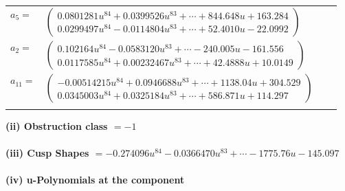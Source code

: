 \documentclass[1p]{elsarticle_modified}
\theoremstyle{definition}
\begin{document}
\begin{tabular}{m{7pt} m{180pt} m{7pt} m{180pt} }
\flushright $a_{5}=$&$\begin{pmatrix}0.0801281 u^{84}+0.0399526 u^{83}+\cdots+844.648 u+163.284\\0.0299497 u^{84}-0.0114804 u^{83}+\cdots+52.4010 u-22.0992\end{pmatrix}$ \\
\flushright $a_{2}=$&$\begin{pmatrix}0.102164 u^{84}-0.0583120 u^{83}+\cdots-240.005 u-161.556\\0.0117585 u^{84}+0.00232467 u^{83}+\cdots+42.4888 u+10.0149\end{pmatrix}$ \\
\flushright $a_{11}=$&$\begin{pmatrix}-0.00514215 u^{84}+0.0946688 u^{83}+\cdots+1138.04 u+304.529\\0.0345003 u^{84}+0.0325184 u^{83}+\cdots+586.871 u+114.297\end{pmatrix}$\\&\end{tabular}
\flushleft \textbf{(ii) Obstruction class $= -1$}\\~\\
\flushleft \textbf{(iii) Cusp Shapes $= -0.274096 u^{84}-0.0366470 u^{83}+\cdots-1775.76 u-145.097$}\\~\\
\newpage\renewcommand{\arraystretch}{1}
\flushleft \textbf{(iv) u-Polynomials at the component}\newline \\
\end{document}
